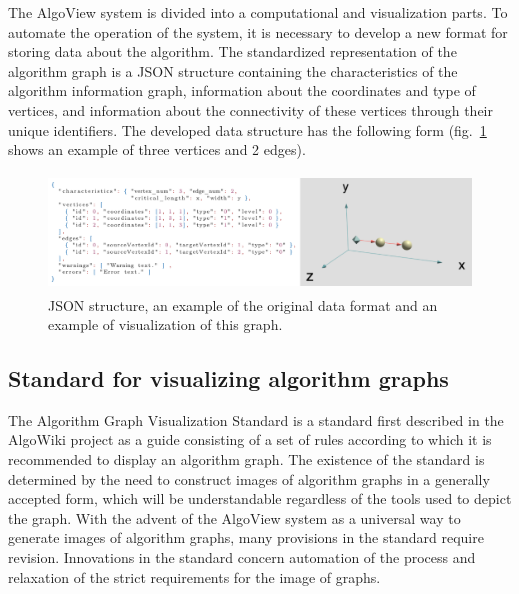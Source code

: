 The AlgoView system is divided into a computational and visualization parts. To automate the operation of the system, it is necessary to develop a new format for storing data about the algorithm. The standardized representation of the algorithm graph is a JSON structure containing the characteristics of the algorithm information graph, information about the coordinates and type of vertices, and information about the connectivity of these vertices through their unique identifiers. The developed data structure has the following form (fig.~\ref{fig1} shows an example of three vertices and 2 edges).

\begin{figure}
\centering
\includegraphics[height=3.1cm]{assets/json_example.png}
\caption{JSON structure, an example of the original data format and an example of visualization of this graph.}
\label{fig1}
\end{figure}

\subsection{Standard for visualizing algorithm graphs}

The Algorithm Graph Visualization Standard is a standard first described in the AlgoWiki project as a guide consisting of a set of rules according to which it is recommended to display an algorithm graph. The existence of the standard is determined by the need to construct images of algorithm graphs in a generally accepted form, which will be understandable regardless of the tools used to depict the graph. With the advent of the AlgoView system as a universal way to generate images of algorithm graphs, many provisions in the standard require revision. Innovations in the standard concern automation of the process and relaxation of the strict requirements for the image of graphs.
